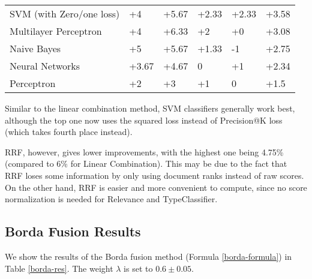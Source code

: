 \begin{table}
{\begin{tabular}{@{}llllll@{}}
SVM (with Zero/one loss)                       	& +4                       & +5.67                       & +2.33                    & +2.33                       & +3.58             \\
Multilayer Perceptron				& +4 			   & +6.33 			 & +2 			    & +0 			  & +3.08 \\
Naive Bayes                                    	& +5                       & +5.67                       & +1.33                    & -1                          & +2.75             \\
Neural Networks                              	& +3.67                    & +4.67                       & 0                        & +1                          & +2.34             \\
Perceptron                                     	& +2                       & +3                          & +1                       & 0                           & +1.5              \\ \bottomrule
\end{tabular}%
}
\end{table}

Similar to the linear combination method, SVM classifiers generally work best,
although the top one now uses the squared loss instead of Precision@K loss (which takes fourth place instead).

RRF, however, gives lower improvements, with the highest one being 4.75\%
(compared to 6\% for Linear Combination).
This may be due to the fact that RRF loses some information by only using document ranks instead of raw scores. On the other hand, RRF
is easier and more convenient to compute, since no score normalization is needed for \textsf{Relevance} and \textsf{TypeClassifier}.


\subsection{Borda Fusion Results}
We show the results of the Borda fusion method (Formula \ref{borda-formula}) in Table \ref{borda-res}.
The weight $\lambda$ is set to $0.6\pm 0.05$.

